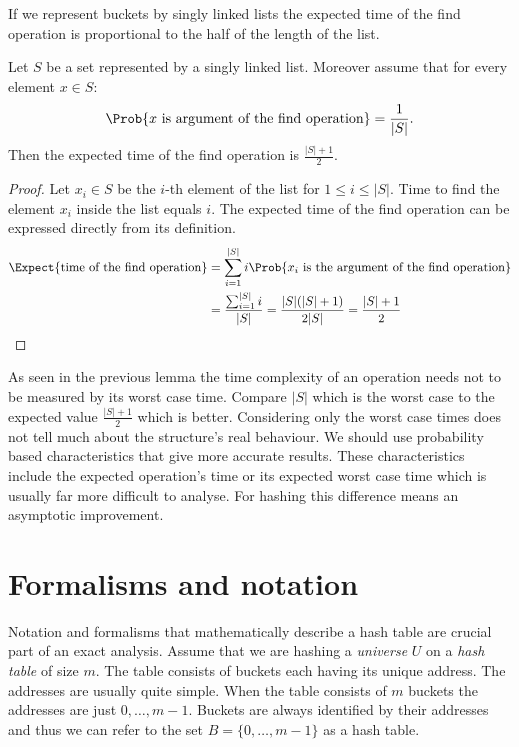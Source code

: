If we represent buckets by singly linked lists the expected time of the find operation is proportional to the half of the length of the list.
\begin{lemma}
\label{lemma-expected-list-time}
Let $S$ be a set represented by a singly linked list. Moreover assume that for every element $x \in S$: \[ \Prob{x \text{ is argument of the find operation}} = \frac{1}{|S|} \text{.} \] Then the expected time of the find operation is $\frac{|S| + 1}{2}$.
\end{lemma}
\begin{proof}
Let $x_i \in S$ be the $i$-th element of the list for $1 \leq i \leq |S|$. Time to find the element $x_i$ inside the list equals $i$. The expected time of the find operation can be expressed directly from its definition. 
\[
\begin{split}
\Expect{\text{time of the find operation}} 
	& = \displaystyle\sum_{i = 1}^{|S|} i \Prob{x_i \text{ is the argument of the find operation}} \\
	& = \frac{\sum_{i = 1}^{|S|}{i}}{|S|} = \frac{|S|(|S| + 1)}{2 |S|} = \frac{|S| + 1}{2} \\
\end{split}
\]
\end{proof}

As seen in the previous lemma the time complexity of an operation needs not to be measured by its worst case time. Compare $|S|$ which is the worst case to the expected value $\frac{|S| + 1}{2}$ which is better. Considering only the worst case times does not tell much about the structure's real behaviour. We should use probability based characteristics that give more accurate results. These characteristics include the expected operation's time or its expected worst case time which is usually far more difficult to analyse. For hashing this difference means an asymptotic improvement.

\section{Formalisms and notation}
Notation and formalisms that mathematically describe a hash table are crucial part of an exact analysis. Assume that we are hashing a \emph{universe} $U$ on a \emph{hash table} of size $m$. The table consists of buckets each having its unique address. The addresses are usually quite simple. When the table consists of $m$ buckets the addresses are just $0, \dots, m - 1$. Buckets are always identified by their addresses and thus we can refer to the set $B = \{0, \dots, m - 1\}$ as a hash table.

